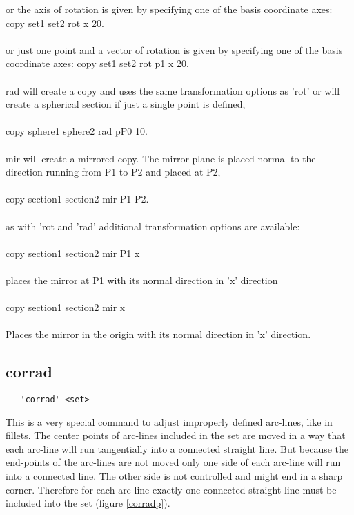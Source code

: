 \documentclass{article}
\begin{document}
or the axis of rotation is given by specifying one of the basis coordinate axes:
copy set1 set2 rot x 20.\\\\
or just one point and a vector of rotation is given by specifying one of the basis coordinate axes:
copy set1 set2 rot p1 x 20.\\\\
rad will create a copy and uses the same transformation options as 'rot' or will create a spherical section if just a single point is defined,\\\\
copy sphere1 sphere2 rad pP0 10.\\\\
mir will create a mirrored copy. The mirror-plane is placed normal to the direction running from P1 to P2 and placed at P2,\\\\
copy section1 section2 mir P1 P2.\\\\
as with 'rot and 'rad' additional transformation options are available:\\\\
copy section1 section2 mir P1 x\\\\
places the mirror at P1 with its normal direction in 'x' direction\\\\
copy section1 section2 mir x\\\\
Places the mirror in the origin with its normal direction in 'x' direction.

\subsection{\label{corrad}corrad}
\begin{verbatim}
   'corrad' <set>
\end{verbatim}
This is a very special command to adjust improperly defined arc-lines, like in fillets. The center points of arc-lines included in the set are moved in a way that each arc-line will run tangentially into a connected straight line. But because the end-points of the arc-lines are not moved only one side of each arc-line will run into a connected line. The other side is not controlled and might end in a sharp corner. Therefore for each arc-line exactly one connected straight line must be included into the set (figure \ref{corradp}).
\end{document}
